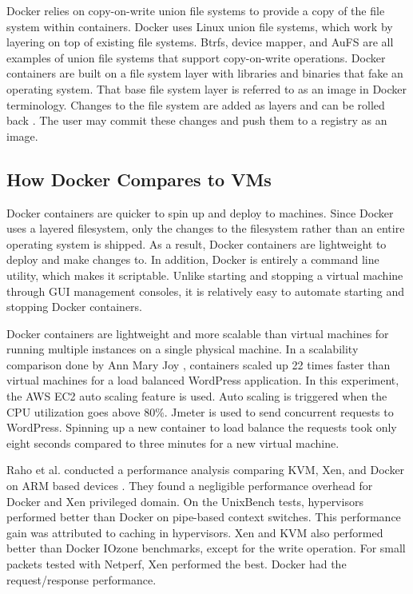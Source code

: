 \documentclass[11pt]{article}
\begin{document}
Docker relies on copy-on-write union file systems to provide a copy of the file system within containers. Docker uses Linux union file systems, which work by layering on top of existing file systems. Btrfs, device mapper, and AuFS are all examples of union file systems that support copy-on-write operations. Docker containers are built on a file system layer with libraries and binaries that fake an operating system. That base file system layer is referred to as an image in Docker terminology. Changes to the file system are added as layers and can be rolled back \cite{anderson}. The user may commit these changes and push them to a registry as an image. 


\subsection{How Docker Compares to VMs}
Docker containers are quicker to spin up and deploy to machines. Since Docker uses a layered filesystem, only the changes to the filesystem rather than an entire operating system is shipped. As a result, Docker containers are lightweight to deploy and make changes to. In addition, Docker is entirely a command line utility, which makes it scriptable. Unlike starting and stopping a virtual machine through GUI management consoles, it is relatively easy to automate starting and stopping Docker containers. 

Docker containers are lightweight and more scalable than virtual machines for running multiple instances on a single physical machine. In a scalability comparison done by Ann Mary Joy \cite{joy}, containers scaled up 22 times faster than virtual machines for a load balanced WordPress application. In this experiment, the AWS EC2 auto scaling feature is used. Auto scaling is triggered when the CPU utilization goes above 80\%. Jmeter is used to send concurrent requests to WordPress. Spinning up a new container to load balance the requests took only eight seconds compared to three minutes for a new virtual machine. 

Raho et al. conducted a performance analysis comparing KVM, Xen, and Docker on ARM based devices \cite{raho}. They found a negligible performance overhead for Docker and Xen privileged domain. On the UnixBench tests, hypervisors performed better than Docker on pipe-based context switches. This performance gain was attributed to caching in hypervisors. Xen and KVM also performed better than Docker IOzone benchmarks, except for the write operation. For small packets tested with Netperf, Xen performed the best. Docker had the request/response performance. 
\end{document}
